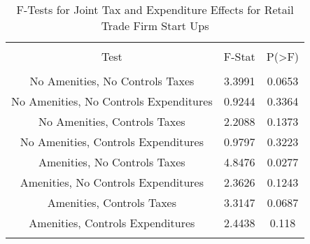 
\begin{table}[!htbp] \centering 
  \caption{F-Tests for Joint Tax and Expenditure Effects for Retail Trade Firm Start Ups} 
  \label{44-45Ftests} 
\begin{tabular}{@{\extracolsep{5pt}} ccc} 
\\[-1.8ex]\hline 
\hline \\[-1.8ex] 
Test & F-Stat & P(\textgreater F) \\ 
\hline \\[-1.8ex] 
No Amenities, No Controls Taxes & 3.3991 & 0.0653 \\ 
No Amenities, No Controls Expenditures & 0.9244 & 0.3364 \\ 
No Amenities, Controls Taxes & 2.2088 & 0.1373 \\ 
No Amenities, Controls Expenditures & 0.9797 & 0.3223 \\ 
Amenities, No Controls Taxes & 4.8476 & 0.0277 \\ 
Amenities, No Controls Expenditures & 2.3626 & 0.1243 \\ 
Amenities, Controls Taxes & 3.3147 & 0.0687 \\ 
Amenities, Controls Expenditures & 2.4438 & 0.118 \\ 
\hline \\[-1.8ex] 
\end{tabular} 
\end{table} 

